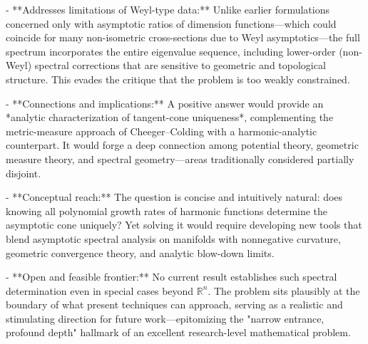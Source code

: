 - **Addresses limitations of Weyl-type data:**  
  Unlike earlier formulations concerned only with asymptotic ratios of dimension functions—which could coincide for many non-isometric cross-sections due to Weyl asymptotics—the full spectrum incorporates the entire eigenvalue sequence, including lower-order (non-Weyl) spectral corrections that are sensitive to geometric and topological structure. This evades the critique that the problem is too weakly constrained.

- **Connections and implications:**  
  A positive answer would provide an *analytic characterization of tangent-cone uniqueness*, complementing the metric-measure approach of Cheeger–Colding with a harmonic-analytic counterpart. It would forge a deep connection among potential theory, geometric measure theory, and spectral geometry—areas traditionally considered partially disjoint.

- **Conceptual reach:**  
  The question is concise and intuitively natural: does knowing all polynomial growth rates of harmonic functions determine the asymptotic cone uniquely? Yet solving it would require developing new tools that blend asymptotic spectral analysis on manifolds with nonnegative curvature, geometric convergence theory, and analytic blow-down limits.

- **Open and feasible frontier:**  
  No current result establishes such spectral determination even in special cases beyond \(\mathbb{R}^n\). The problem sits plausibly at the boundary of what present techniques can approach, serving as a realistic and stimulating direction for future work—epitomizing the "narrow entrance, profound depth" hallmark of an excellent research-level mathematical problem.